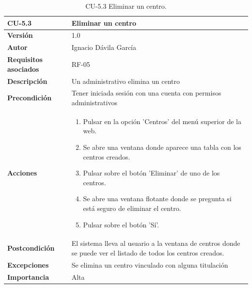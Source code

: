 \begin{table}[p]
	\centering
	\begin{tabularx}{\linewidth}{ p{} p{} }
		\toprule
		\textbf{CU-5.3}    & \textbf{Eliminar un centro}\\
		\toprule
		\textbf{Versión}              & 1.0    \\
		\textbf{Autor}                & Ignacio Dávila García \\
		\textbf{Requisitos asociados} & RF-05 \\
		\textbf{Descripción}          & Un administrativo elimina un centro \\
		\textbf{Precondición}         & Tener iniciada sesión con una cuenta con permisos administrativos \\
		\textbf{Acciones}             &
		\begin{enumerate}
			\def\labelenumi{\arabic{enumi}.}
			\tightlist
			\item Pulsar en la opción 'Centros' del menú superior de la web.
			\item Se abre una ventana donde aparece una tabla con los centros creados.
			\item Pulsar sobre el botón 'Eliminar' de uno de los centros.
			\item Se abre una ventana flotante donde se pregunta si está seguro de eliminar el centro.
			\item Pulsar sobre el botón 'Sí'.
		\end{enumerate}\\
		\textbf{Postcondición}        & El sistema lleva al usuario a la ventana de centros donde se puede ver el listado de todos los centros creados. \\
		\textbf{Excepciones}          & Se elimina un centro vinculado con alguna titulación \\
		\textbf{Importancia}          & Alta \\
		\bottomrule
	\end{tabularx}
	\caption{CU-5.3 Eliminar un centro.}
\end{table}

